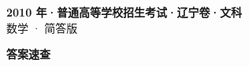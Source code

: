 \documentclass[zihao=-4, a4paper]{ctexart}
\begin{document}
\begin{center}
  {\Large\bfseries 2010 年·普通高等学校招生考试·辽宁卷·文科}\\[4pt]
  {\large 数学 · 简答版}
\end{center}
\medskip
{}

\clearpage
{}
\begin{center}{\Large\bfseries 答案速查}\end{center}
\medskip

\end{document}
